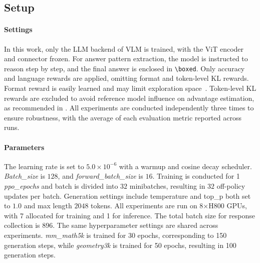 \documentclass{article} %
\begin{document}
\subsection{Setup}

\paragraph{Settings} In this work, only the LLM backend of VLM is trained, with the ViT encoder and connector frozen. For answer pattern extraction, the model is instructed to reason step by step, and the final answer is enclosed in \texttt{\textbackslash boxed{}}. Only accuracy and language rewards are applied, omitting format and token-level KL rewards.
%
Format reward is easily learned and may limit exploration space~\cite{zeng2025simplerlzooinvestigatingtamingzero}.
%
Token-level KL rewards are excluded to avoid reference model influence on advantage estimation, as recommended in \cite{xie2025logicrlunleashingllmreasoning}.
%
All experiments are conducted independently three times to ensure robustness, with the average of each evaluation metric reported across runs.


\paragraph{Parameters} The learning rate is set to $5.0\times10^{-6}$ with a warmup and cosine decay scheduler. \textit{Batch\_size} is $128$, and \textit{forward\_batch\_size} is $16$. Training is conducted for 1 \textit{ppo\_epochs} and batch is divided into $32$ minibatches, resulting in $32$ off-policy updates per batch. Generation settings include temperature and top\_p both set to $1.0$ and max length $2048$ tokens. All experiments are run on 8×H800 GPUs, with 7 allocated for training and 1 for inference. The total batch size for response collection is 896. The same hyperparameter settings are shared across experiments.
%
\textit{mm\_math5k} is trained for 30 epochs, corresponding to 150 generation steps, while \textit{geometry3k} is trained for 50 epochs, resulting in 100 generation steps.
%
\end{document}
